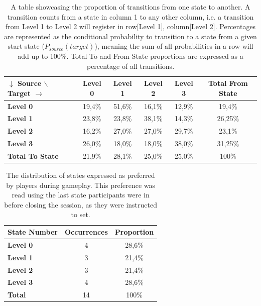 \begin{table}[!h]
	\begin{center}
		\begin{tabular}{|l|c|c|c|c|c|} 
			\hline
			\bf $\downarrow$ Source $\backslash$ Target $\rightarrow$   & \bf Level 0 & \bf Level 1 & \bf Level 2 & \bf Level 3 & \bf Total From State \\
			\hline
			\bf Level 0 & 19,4\% & 51,6\% & 16,1\% & 12,9\% & 19,4\% \\
			\bf Level 1 & 23,8\% & 23,8\% & 38,1\% & 14,3\% & 26,25\% \\
			\bf Level 2 & 16,2\% & 27,0\% & 27,0\% & 29,7\% & 23,1\% \\
			\bf Level 3 & 26,0\% & 18,0\% & 18,0\% & 38,0\% & 31,25\% \\
			\hline
			\bf Total To State & 21,9\% & 28,1\% & 25,0\% & 25,0\% & 100\% \\
			\hline
		\end{tabular}
	\end{center}
	\caption[Proportional State Transition Matrix]{A table showcasing the proportion of transitions from one state to another. A transition counts from a state in column 1 to any other column, i.e. a transition from Level 1 to Level 2 will register in row[Level 1], column[Level 2]. Percentages are represented as the conditional probability to transition to a state from a given start state ($P_{source}(target)$), meaning the sum of all probabilities in a row will add up to 100\%. Total To and From State proportions are expressed as a percentage of all transitions.}	
	\label{tab::transition-matrix-percent}
\end{table}

\begin{table}[!h]
	\begin{center}
		\begin{tabular}{|l|c|c|} 
			\hline
			\bf State Number  & \bf Occurrences & \bf Proportion \\
			\hline
			\bf Level 0 & 4 & 28,6\% \\
			\bf Level 1 & 3 & 21,4\% \\
			\bf Level 2 & 3 & 21,4\% \\
			\bf Level 3 & 4 & 28,6\% \\
			\hline
			\bf Total & 14 & 100\% \\
			\hline
		\end{tabular}
	\end{center}
	\caption[Final State Preference Table]{The distribution of states expressed as preferred by players during gameplay. This preference was read using the last state participants were in before closing the session, as they were instructed to set.}	
	\label{tab::state-pref-table}
\end{table}

